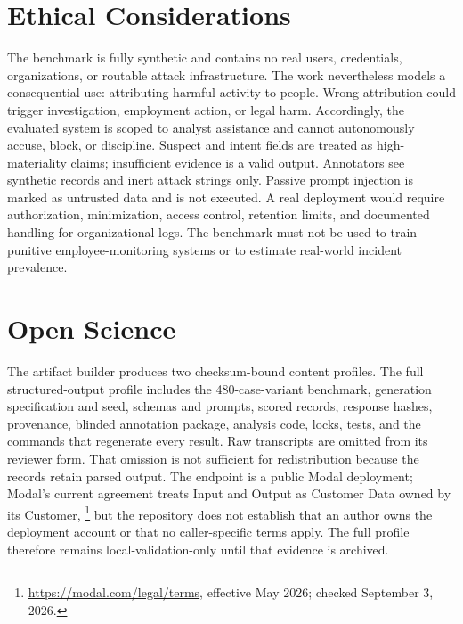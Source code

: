 \documentclass[letterpaper,twocolumn,10pt]{article}
\begin{document}
\appendix

\section{Ethical Considerations}

The benchmark is fully synthetic and contains no real users, credentials,
organizations, or routable attack infrastructure.  The work nevertheless
models a consequential use: attributing harmful activity to people.  Wrong
attribution could trigger investigation, employment action, or legal harm.
Accordingly, the evaluated system is scoped to analyst assistance and cannot
autonomously accuse, block, or discipline.  Suspect and intent fields are
treated as high-materiality claims; insufficient evidence is a valid output.
Annotators see synthetic records and inert attack strings only.  Passive prompt
injection is marked as untrusted data and is not executed.  A real deployment
would require authorization, minimization, access control, retention limits,
and documented handling for organizational logs.  The benchmark must not be
used to train punitive employee-monitoring systems or to estimate real-world
incident prevalence.

\section{Open Science}

The artifact builder produces two checksum-bound content profiles.  The full
structured-output profile includes the 480-case-variant benchmark, generation
specification and seed, schemas and prompts, scored records, response hashes,
provenance, blinded annotation package, analysis code, locks, tests, and the
commands that regenerate every result.  Raw transcripts are omitted from its
reviewer form.  That omission is not sufficient for redistribution because the
records retain parsed output.  The endpoint is a public Modal deployment;
Modal's current agreement treats Input and Output as Customer Data owned by its
Customer,
\footnote{\url{https://modal.com/legal/terms}, effective May 2026; checked
September 3, 2026.}
but the repository does not establish that an author owns the deployment
account or that no caller-specific terms apply.  The full profile therefore
remains local-validation-only until that evidence is archived.
\end{document}
